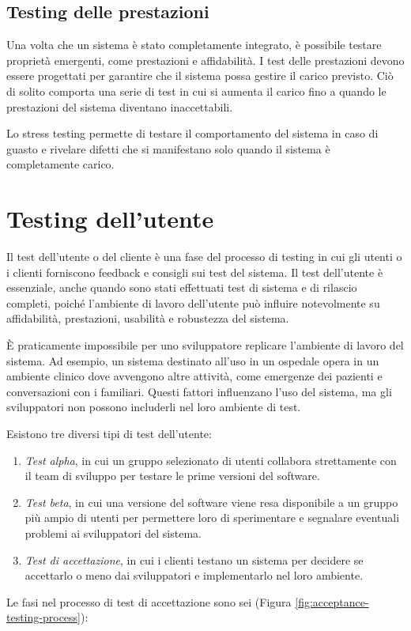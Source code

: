 \subsection{Testing delle prestazioni}
Una volta che un sistema è stato completamente integrato, è possibile testare proprietà emergenti, come prestazioni e affidabilità. I test delle prestazioni devono essere progettati per garantire che il sistema possa gestire il carico previsto. Ciò di solito comporta una serie di test in cui si aumenta il carico fino a quando le prestazioni del sistema diventano inaccettabili.

Lo stress testing permette di testare il comportamento del sistema in caso di guasto e 
rivelare difetti che si manifestano solo quando il sistema è completamente carico.

\section{Testing dell'utente}
Il test dell'utente o del cliente è una fase del processo di testing in cui gli utenti o i clienti forniscono feedback e consigli sui test del sistema. Il test dell'utente è essenziale, anche quando sono stati effettuati test di sistema e di rilascio completi, poiché l'ambiente di lavoro dell'utente può influire notevolmente su affidabilità, prestazioni, usabilità e robustezza del sistema.

È praticamente impossibile per uno sviluppatore replicare l'ambiente di lavoro del sistema. Ad esempio, un sistema destinato all'uso in un ospedale opera in un ambiente clinico dove avvengono altre attività, come emergenze dei pazienti e conversazioni con i familiari. Questi fattori influenzano l'uso del sistema, ma gli sviluppatori non possono includerli nel loro ambiente di test.

Esistono tre diversi tipi di test dell'utente:
\begin{enumerate}
    \item \textit{Test alpha}, in cui un gruppo selezionato di utenti collabora strettamente con il team di sviluppo per testare le prime versioni del software.
    \item \textit{Test beta}, in cui una versione del software viene resa disponibile a un gruppo più ampio di utenti per permettere loro di sperimentare e segnalare eventuali problemi ai sviluppatori del sistema.
    \item \textit{Test di accettazione}, in cui i clienti testano un sistema per decidere se accettarlo o meno dai sviluppatori e implementarlo nel loro ambiente.
\end{enumerate}
    \label{fig:acceptance-testing-process}
Le fasi nel processo di test di accettazione sono sei (Figura \ref{fig:acceptance-testing-process}):

